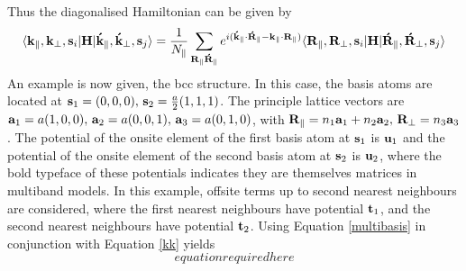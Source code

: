\documentclass[a4paper, 12pt]{article}
\begin{document}
	Thus the diagonalised Hamiltonian can be given by 
	\begin{equation}\label{multibasis}
		\langle{\bf k}_\parallel, {\bf k}_\perp, {\bf s}_i|{\bf H}|{\bf \acute{k}}_\parallel, {\bf \acute{k}}_\perp, {\bf s}_j\rangle = \frac{1}{N_\parallel}\sum_{\bf R_\parallel \acute{R}_\parallel}  e^{i({\bf \acute{k}}_\parallel\cdot {\bf \acute{R}}_\parallel-{\bf k}_\parallel\cdot {\bf R}_\parallel)} \langle{\bf R}_\parallel,{\bf R}_\perp, {\bf s}_i|{\bf H}|{\bf \acute{R}}_\parallel,{\bf \acute{R}}_\perp, {\bf s}_j \rangle
	\end{equation}
	An example is now given, the \gls{bcc} structure.
	In this case, the basis atoms are located at ${\bf s}_1=(0,0,0), \, {\bf s}_2=\frac{a}{2}(1,1,1)$.
	The principle lattice vectors are ${\bf a}_1 = a(1,0,0), \, {\bf a}_2 = a(0,0,1), \, {\bf a}_3 = a(0,1,0)$,
	with ${\bf R}_\parallel = n_1{\bf a}_1 + n_2{\bf a}_2, \, {\bf R}_\perp = n_3 {\bf a}_3$.
	The potential of the onsite element of the first basis atom at ${\bf s}_1$ is ${\bf u}_1$ and the potential of the onsite element of the second basis atom at ${\bf s}_2$ is ${\bf u}_2$,
	where the bold typeface of these potentials indicates they are themselves matrices in multiband models.
	In this example, offsite terms up to second nearest neighbours are considered, where the first nearest neighbours have potential ${\bf t}_1$, and the second nearest neighbours have potential ${\bf t}_2$.
	Using Equation \eqref{multibasis} in conjunction with Equation \eqref{kk} yields
	\begin{equation}
		equation required here
	\end{equation}
\end{document}

